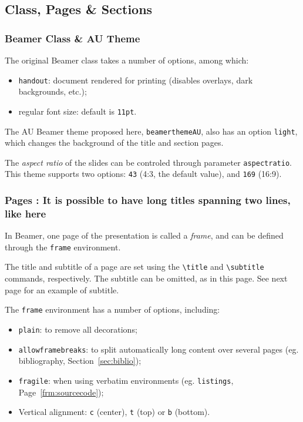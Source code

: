 \documentclass[10pt,    %
    english,            %
    xcolor=table,       %
    envcountsect,       %
    aspectratio=43      %
]{beamer}
\begin{document}
\subsection{Class, Pages \& Sections}

\begin{frame}
    \frametitle{Beamer Class \& AU Theme}
    
    The original Beamer class takes a number of options, among which:
    \begin{itemize}
        \item \texttt{handout}: document rendered for printing (disables overlays, dark backgrounds, etc.);
        \item regular font size: default is \texttt{11pt}.
    \end{itemize}

    \medskip
    The AU Beamer theme proposed here, \texttt{beamerthemeAU}, also has an option \texttt{light}, which changes the background of the title and section pages.
    
    \medskip
    The \textit{aspect ratio} of the slides can be controled through parameter \texttt{aspectratio}. This theme supports two options: \texttt{43} (4:3, the default value), and \texttt{169} (16:9).
\end{frame}

\begin{frame}
    \frametitle{Pages : It is possible to have long titles spanning two lines, like here} 
    
    In Beamer, one page of the presentation is called a \textit{frame}, and can be defined through the \texttt{frame} environment.
    
    \medskip
    The title and subtitle of a page are set using the \texttt{\textbackslash{}title} and \texttt{\textbackslash{}subtitle} commands, respectively. The subtitle can be omitted, as in this page. See next page for an example of subtitle.
    
    \medskip
    The \texttt{frame} environment has a number of options, including: 
    \begin{itemize}
        \item \texttt{plain}: to remove all decorations;
        \item \texttt{allowframebreaks}: to split automatically long content over several pages (eg. bibliography, Section~\ref{sec:biblio});
        \item \texttt{fragile}: when using verbatim environments (eg. \texttt{listings}, Page~\ref{frm:sourcecode});
        \item Vertical alignment: \texttt{c} (center), \texttt{t} (top) or \texttt{b} (bottom).
    \end{itemize}
\end{frame}
\end{document}
